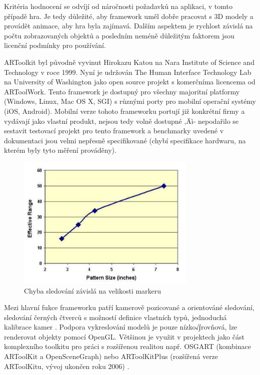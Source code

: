 \documentclass[twoside,12pt]{article}
\begin{document}
% 
\newpage 


Kritéria hodnocení se odvíjí od náročnosti požadavků na aplikaci, v tomto případě hra. Je tedy důležité, aby framework uměl dobře pracovat s 3D modely a provádět animace, aby hra byla zajímavá. Dalším aspektem je rychlost závislá na počtu zobrazovaných objektů a posledním neméně důležitým faktorem jsou licenční podmínky pro používání.


ARToolkit byl původně vyvinut Hirokazu Katou na Nara Institute of Science and Technology v roce 1999. Nyní je udržován The Human Interface Technology Lab na University of Washington jako open source projekt s komerčníma licencema od ARToolWork. Tento framework je dostupný pro všechny majoritní platformy (Windows, Linux, Mac OS X, SGI) s různými porty pro mobilní operační systémy (iOS, Android). Mobilní verze tohoto frameworku portují již konkrétní firmy a vydávají jako vlastní produkt, nejsou tedy volně dostupné ‚Äì- nepodařilo se sestavit testovací projekt pro tento framework a benchmarky uvedené v dokumentaci jsou velmi nepřesně specifikované (chybí specifikace hardwaru, na kterém byly tyto měření prováděny). 

\begin{figure}[H]
    \includegraphics[width=324px, center]{images/artoolkit_benchmark.jpg}
    \caption{Chyba sledování závislá na velikosti markeru}
    \label{artoolkit_benchmark}
\end{figure}

Mezi hlavní fukce frameworku patří kamerově pozicované a orientováné sledování, sledování černých čtverců s možností definice vlastních typů, jednoduchá kalibrace kamer \cite{artoolkit_features}. Podpora vykreslování modelů je pouze nízko√∫rovňová, lze renderovat objekty pomocí OpenGL. Většinou je využit v projektech jako část komplexního toolkitu pro práci s rozšířenou realitou např. OSGART (kombinace ARToolKit a OpenSceneGraph) \cite{osgart} nebo ARToolKitPlus (rozšířená verze ARToolKitu, vývoj ukončen roku 2006) \cite{wagner_schmalstieg}. 
\end{document}
